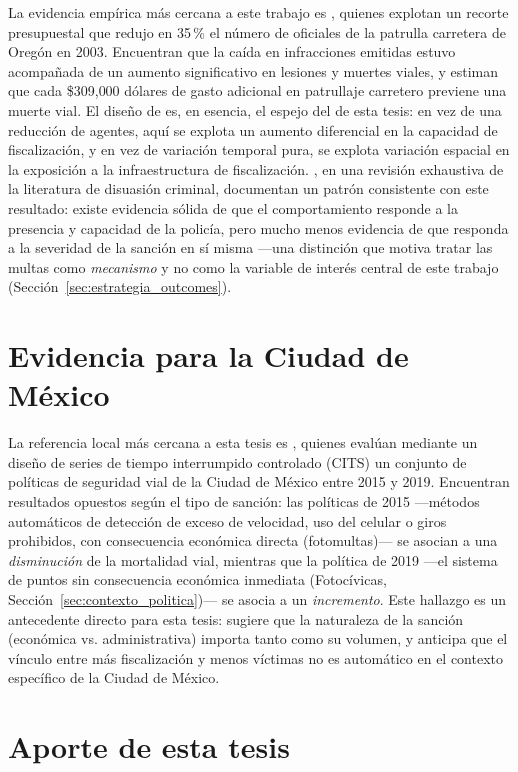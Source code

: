 La evidencia empírica más cercana a este trabajo es \citet{deangelohansen2014},
quienes explotan un recorte presupuestal que redujo en 35\,\% el número de
oficiales de la patrulla carretera de Oregón en 2003. Encuentran que la caída
en infracciones emitidas estuvo acompañada de un aumento significativo en
lesiones y muertes viales, y estiman que cada \$309{,}000 dólares de gasto
adicional en patrullaje carretero previene una muerte vial. El diseño de
\citeauthor{deangelohansen2014} es, en esencia, el espejo del de esta
tesis: en vez de una reducción de agentes, aquí se explota un aumento
diferencial en la capacidad de fiscalización, y en vez de variación temporal
pura, se explota variación espacial en la exposición a la infraestructura de
fiscalización. \citet{chalfinmccrary2017}, en una revisión exhaustiva de la
literatura de disuasión criminal, documentan un patrón consistente con este
resultado: existe evidencia sólida de que el comportamiento responde a la
presencia y capacidad de la policía, pero mucho menos evidencia de que
responda a la severidad de la sanción en sí misma —una distinción que motiva
tratar las multas como \emph{mecanismo} y no como la variable de interés
central de este trabajo (Sección~\ref{sec:estrategia_outcomes}).

\section{Evidencia para la Ciudad de México}

La referencia local más cercana a esta tesis es \citet{quintero2023}, quienes
evalúan mediante un diseño de series de tiempo interrumpido controlado (CITS)
un conjunto de políticas de seguridad vial de la Ciudad de México entre 2015 y
2019. Encuentran resultados opuestos según el tipo de sanción: las políticas
de 2015 —métodos automáticos de detección de exceso de velocidad, uso del
celular o giros prohibidos, con consecuencia económica directa (fotomultas)—
se asocian a una \emph{disminución} de la mortalidad vial, mientras que la
política de 2019 —el sistema de puntos sin consecuencia económica inmediata
(Fotocívicas, Sección~\ref{sec:contexto_politica})— se asocia a un
\emph{incremento}. Este hallazgo es un antecedente directo para esta tesis:
sugiere que la naturaleza de la sanción (económica vs. administrativa) importa
tanto como su volumen, y anticipa que el vínculo entre más fiscalización y
menos víctimas no es automático en el contexto específico de la Ciudad de
México.

\section{Aporte de esta tesis}

